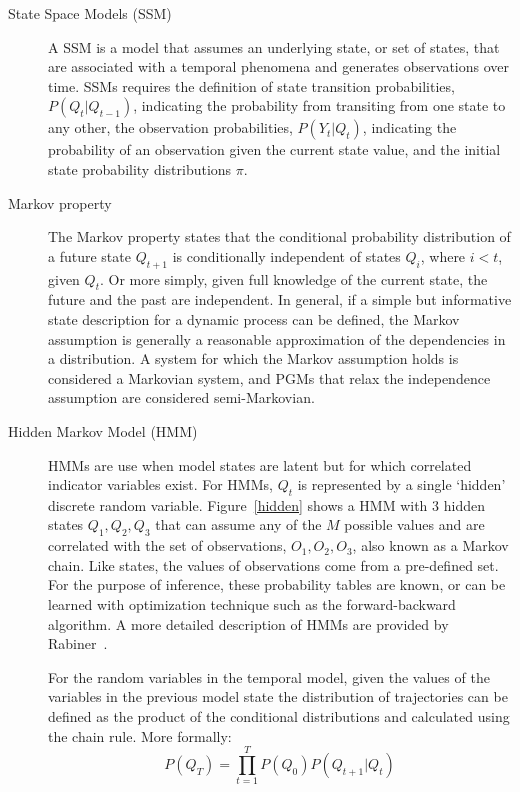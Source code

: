\begin{description}
  \item[State Space Models (SSM)]  A SSM is a model that assumes an underlying state, or set of states, that are associated with a temporal phenomena and generates observations over time.  SSMs requires the definition of state transition probabilities, $P(Q_{t} | Q_{t-1})$, indicating the probability from transiting from one state to any other, the observation probabilities, $P(Y_{t} | Q_{t})$, indicating the probability of an observation given the current state value, and the initial state probability distributions $\pi$.
  \item[Markov property]  The Markov property states that the conditional probability distribution of a future state $Q_{t+1}$ is conditionally independent of states $Q_{i}$, where $i<t$, given $Q_{t}$.  Or more simply, given full knowledge of the current state, the future and the past are independent.  In general, if a simple but informative state description for a dynamic process can be defined, the Markov assumption is generally a reasonable approximation of the dependencies in a distribution.  A system for which the Markov assumption holds is considered a Markovian system, and PGMs that  relax the independence assumption are considered semi-Markovian.
  \item[Hidden Markov Model (HMM)] HMMs are use when model states are latent but for which correlated indicator variables exist. For HMMs, $Q_{t}$ is represented by a single `hidden' discrete random variable.  Figure~\ref{hidden} shows a HMM with 3 hidden states $Q_{1},Q_{2},Q_{3}$ that can assume any of the $M$ possible values and are correlated with the set of observations, $O_{1},O_{2},O_{3}$, also known as a Markov chain.  Like states, the values of observations come from a pre-defined set.  For the purpose of inference, these probability tables are known, or can be learned with optimization technique such as the forward-backward algorithm.   A more detailed description of HMMs are provided by Rabiner~\cite{Rabiner89atutorial}.

For the random variables in the temporal model, given the values of the variables in the previous model state the distribution of trajectories can be defined as the product of the conditional distributions and calculated using the chain rule.  More formally:
$$P(Q_{T})=\prod_{t=1}^{T}P(Q_{0})P(Q_{t+1} | Q_{t})$$

    \begin{figure}
\begin{center}
\end{center}
\end{figure}
\end{description}
